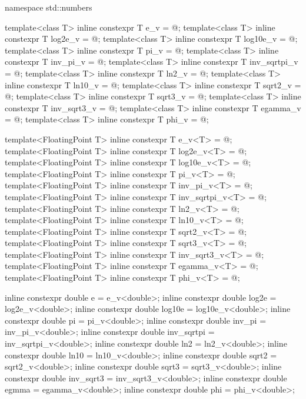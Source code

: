 \begin{codeblock}
namespace std::numbers {
  template<class T> inline constexpr T e_v          = @\unspec@;
  template<class T> inline constexpr T log2e_v      = @\unspec@;
  template<class T> inline constexpr T log10e_v     = @\unspec@;
  template<class T> inline constexpr T pi_v         = @\unspec@;
  template<class T> inline constexpr T inv_pi_v     = @\unspec@;
  template<class T> inline constexpr T inv_sqrtpi_v = @\unspec@;
  template<class T> inline constexpr T ln2_v        = @\unspec@;
  template<class T> inline constexpr T ln10_v       = @\unspec@;
  template<class T> inline constexpr T sqrt2_v      = @\unspec@;
  template<class T> inline constexpr T sqrt3_v      = @\unspec@;
  template<class T> inline constexpr T inv_sqrt3_v  = @\unspec@;
  template<class T> inline constexpr T egamma_v     = @\unspec@;
  template<class T> inline constexpr T phi_v        = @\unspec@;

  template<FloatingPoint T> inline constexpr T e_v<T>          = @\seebelow@;
  template<FloatingPoint T> inline constexpr T log2e_v<T>      = @\seebelow@;
  template<FloatingPoint T> inline constexpr T log10e_v<T>     = @\seebelow@;
  template<FloatingPoint T> inline constexpr T pi_v<T>         = @\seebelow@;
  template<FloatingPoint T> inline constexpr T inv_pi_v<T>     = @\seebelow@;
  template<FloatingPoint T> inline constexpr T inv_sqrtpi_v<T> = @\seebelow@;
  template<FloatingPoint T> inline constexpr T ln2_v<T>        = @\seebelow@;
  template<FloatingPoint T> inline constexpr T ln10_v<T>       = @\seebelow@;
  template<FloatingPoint T> inline constexpr T sqrt2_v<T>      = @\seebelow@;
  template<FloatingPoint T> inline constexpr T sqrt3_v<T>      = @\seebelow@;
  template<FloatingPoint T> inline constexpr T inv_sqrt3_v<T>  = @\seebelow@;
  template<FloatingPoint T> inline constexpr T egamma_v<T>     = @\seebelow@;
  template<FloatingPoint T> inline constexpr T phi_v<T>        = @\seebelow@;

  inline constexpr double e          = e_v<double>;
  inline constexpr double log2e      = log2e_v<double>;
  inline constexpr double log10e     = log10e_v<double>;
  inline constexpr double pi         = pi_v<double>;
  inline constexpr double inv_pi     = inv_pi_v<double>;
  inline constexpr double inv_sqrtpi = inv_sqrtpi_v<double>;
  inline constexpr double ln2        = ln2_v<double>;
  inline constexpr double ln10       = ln10_v<double>;
  inline constexpr double sqrt2      = sqrt2_v<double>;
  inline constexpr double sqrt3      = sqrt3_v<double>;
  inline constexpr double inv_sqrt3  = inv_sqrt3_v<double>;
  inline constexpr double egmma      = egamma_v<double>;
  inline constexpr double phi        = phi_v<double>;
}
\end{codeblock}

